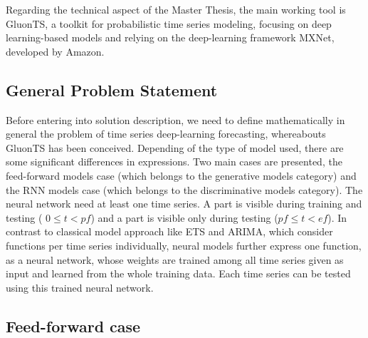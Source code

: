 \documentclass[a4paper, 12pt]{article}
\begin{document}
Regarding the technical aspect of the Master Thesis, the main working tool 
is GluonTS, a toolkit for probabilistic time series modeling, focusing on deep learning-based models and relying on the deep-learning framework MXNet, developed by Amazon.


\subsection{General Problem Statement}

Before entering into solution description, we need to define mathematically in general the problem of time series deep-learning forecasting, whereabouts GluonTS has been conceived. 
Depending of the type of model used, there are some significant differences in expressions. 
Two main cases are presented, the feed-forward models case (which belongs to the generative models category) and the RNN models case (which belongs to the discriminative models category).
The neural network need at least one time series. A part is visible during training and testing ( $0\leq t<pf$) and a part is visible only during testing ($pf\leq t < ef$).
 In contrast to classical model approach like ETS and ARIMA, which consider functions per time series individually, neural models further express one function, as a neural network, whose weights are trained among all time series given as input and learned from the whole training data. Each time series can be tested using this trained neural network.

\subsection{Feed-forward case}

\begin{center}
\end{center}
\end{document}
